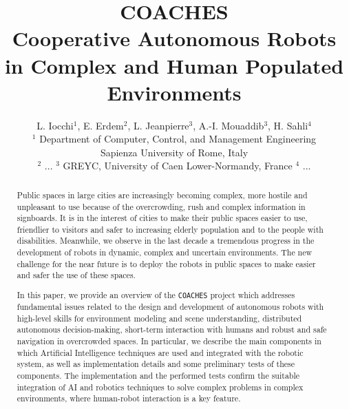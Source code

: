 \documentclass{llncs}
\def\coaches{{\tt COACHES} }
\begin{document}
%
%
%
%
\title{COACHES\\
Cooperative Autonomous Robots in Complex and Human Populated Environments}
%
%
\author{L. Iocchi$^1$,  E. Erdem$^2$,  L. Jeanpierre$^3$, A.-I. Mouaddib$^3$, H. Sahli$^4$ \\
$^1$ Department of Computer, Control, and Management Engineering\\ 
Sapienza University of Rome, Italy\\
$^2$ ...
$^3$ GREYC, University of Caen Lower-Normandy, France
$^4$ ...
}

\institute{}
\date{}

%
%

\maketitle              %

\begin{abstract}

Public spaces in large cities are increasingly becoming complex, more hostile and  
unpleasant to use because of the overcrowding, rush and complex information in signboards. 
It is in the interest of cities to make their public spaces easier to use, friendlier to visitors and safer to increasing elderly population and to the people with disabilities. 
Meanwhile, we observe in the last decade a tremendous progress in the development of robots in dynamic, complex and uncertain environments. The new challenge for the near future is to deploy the robots in public spaces to make easier and safer the use of these spaces. 

In this paper, we provide an overview of the \coaches project which addresses fundamental issues related to the design and development of autonomous robots with high-level skills for environment modeling and scene understanding, distributed autonomous decision-making, short-term interaction with humans and robust and safe navigation in overcrowded spaces. 
In particular, we describe the main components in which Artificial Intelligence techniques are used and integrated with the robotic system, as well as implementation details and some preliminary tests of these components. The implementation and the performed tests confirm the suitable integration of AI and robotics techniques to solve complex problems in complex environments, where human-robot interaction is a key feature.

\end{abstract}
\end{document}
